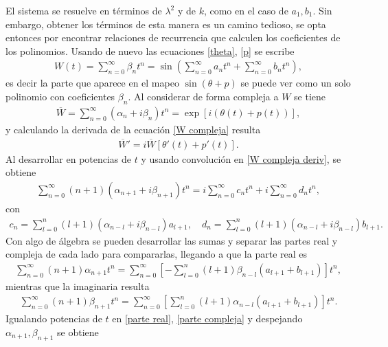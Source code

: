 El sistema se resuelve en términos de $\lambda^{2}$ y de $k$, como en el caso de $a_{1},b_{1}$. Sin embargo, obtener los términos de esta manera es un camino tedioso, se opta entonces por encontrar relaciones de recurrencia que calculen los coeficientes de los polinomios. Usando de nuevo las ecuaciones \eqref{theta}, \eqref{p} se escribe
\begin{eqnarray}
W(t)=\sum_{n=0}^{\infty}\beta_{n}t^{n}=\sin\left(\sum_{n=0}^{\infty}a_{n}t^{n}+\sum_{n=0}^{\infty}
b_{n}t^{n}\right),
\end{eqnarray} 
es decir la parte que aparece en el mapeo $\sin(\theta+p)$ se puede ver como un solo polinomio con coeficientes $\beta_{n}$. Al considerar de forma compleja a $W$ se tiene
\begin{eqnarray}
\overline{W}=\sum_{n=0}^{\infty}(\alpha_{n}+i\beta_{n})t^{n}=\exp[i(\theta(t)+p(t))],
\label{W compleja}
\end{eqnarray}
y calculando la derivada de la ecuación \eqref{W compleja} resulta
\begin{eqnarray}
\overline{W}'=i\overline{W}[\theta '(t)+p'(t)].
\label{W compleja deriv}
\end{eqnarray}
Al desarrollar en potencias de $t$ y usando convolución en \eqref{W compleja deriv}, se obtiene
\begin{eqnarray}
\sum_{n=0}^{\infty}(n+1)(\alpha_{n+1}+i\beta_{n+1})t^{n}=i\sum_{n=0}^{\infty}c_{n}t^{n}+i\sum_{n=0}^{\infty}d_{n}t^{n},
\end{eqnarray}
con
\begin{eqnarray}
c_{n}=\sum_{l=0}^{n}(l+1)(\alpha_{n-l}+i\beta_{n-l})a_{l+1}, \quad
d_{n}=\sum_{l=0}^{n}(l+1)(\alpha_{n-l}+i\beta_{n-l})b_{l+1}.
\end{eqnarray}
Con algo de álgebra se pueden desarrollar las sumas y separar las partes real y compleja de cada lado para compararlas, llegando a que la parte real es
\begin{eqnarray}
\sum_{n=0}^{\infty}(n+1)\alpha_{n+1}t^{n}=\sum_{n=0}^{\infty}\left[-\sum_{l=0}^{n}(l+1)\beta_{n-l}(a_{l+1}+b_{l+1})\right]t^{n},
\label{parte real}
\end{eqnarray}
mientras que la imaginaria resulta
\begin{eqnarray}
\sum_{n=0}^{\infty}(n+1)\beta_{n+1}t^{n}=\sum_{n=0}^{\infty}\left[\sum_{l=0}^{n}(l+1)\alpha_{n-l}(a_{l+1}+b_{l+1})\right]t^{n}.
\label{parte compleja}
\end{eqnarray}
Igualando potencias de $t$ en \eqref{parte real}, \eqref{parte compleja} y despejando $\alpha_{n+1},\beta_{n+1}$ se obtiene
